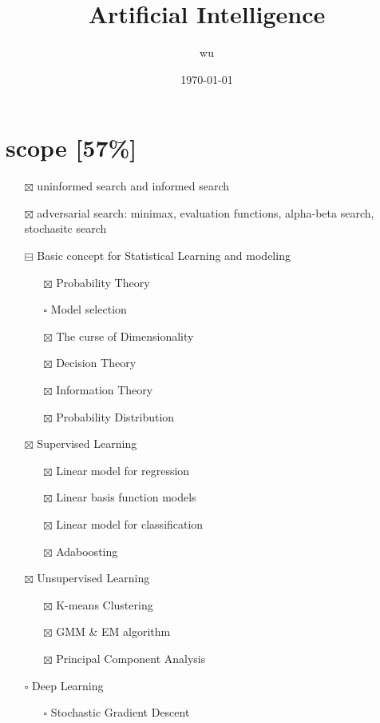 \documentclass[11pt]{article}
\author{wu}
\date{\today}
\title{Artificial Intelligence}
\begin{document}
\maketitle
\tableofcontents

\section{scope [57\%]}
\label{sec:org4262ac7}
\begin{itemize}
\item[{$\boxtimes$}] uninformed search and informed search
\item[{$\boxtimes$}] adversarial search: minimax, evaluation functions, alpha-beta search,
stochasitc search
\item[{$\boxminus$}] Basic concept for Statistical Learning and modeling
\begin{itemize}
\item[{$\boxtimes$}] Probability Theory
\item[{$\square$}] Model selection
\item[{$\boxtimes$}] The curse of Dimensionality
\item[{$\boxtimes$}] Decision Theory
\item[{$\boxtimes$}] Information Theory
\item[{$\boxtimes$}] Probability Distribution
\end{itemize}
\item[{$\boxtimes$}] Supervised Learning
\begin{itemize}
\item[{$\boxtimes$}] Linear model for regression
\item[{$\boxtimes$}] Linear basis function models
\item[{$\boxtimes$}] Linear model for classification
\item[{$\boxtimes$}] Adaboosting
\end{itemize}
\item[{$\boxtimes$}] Unsupervised Learning
\begin{itemize}
\item[{$\boxtimes$}] K-means Clustering
\item[{$\boxtimes$}] GMM \& EM algorithm
\item[{$\boxtimes$}] Principal Component Analysis
\end{itemize}
\item[{$\square$}] Deep Learning
\begin{itemize}
\item[{$\square$}] Stochastic Gradient Descent

\end{itemize}
\end{itemize}
\end{document}
